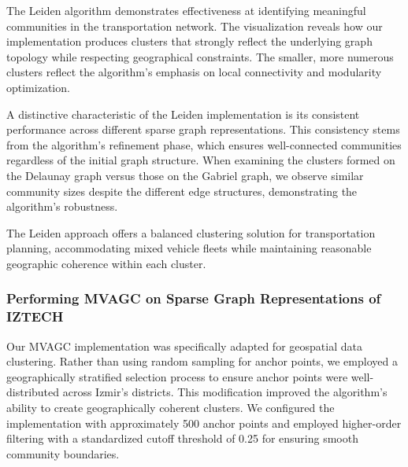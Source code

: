 The Leiden algorithm demonstrates effectiveness at identifying meaningful communities in the transportation network. The visualization reveals how our implementation produces clusters that strongly reflect the underlying graph topology while respecting geographical constraints. The smaller, more numerous clusters reflect the algorithm's emphasis on local connectivity and modularity optimization.

A distinctive characteristic of the Leiden implementation is its consistent performance across different sparse graph representations. This consistency stems from the algorithm's refinement phase, which ensures well-connected communities regardless of the initial graph structure. When examining the clusters formed on the Delaunay graph versus those on the Gabriel graph, we observe similar community sizes despite the different edge structures, demonstrating the algorithm's robustness.

The Leiden approach offers a balanced clustering solution for transportation planning, accommodating mixed vehicle fleets while maintaining reasonable geographic coherence within each cluster.

\subsubsection{Performing MVAGC on Sparse Graph Representations of IZTECH}
\label{subsubsec:mvagc_implementation}

Our MVAGC implementation was specifically adapted for geospatial data clustering. Rather than using random sampling for anchor points, we employed a geographically stratified selection process to ensure anchor points were well-distributed across Izmir's districts. This modification improved the algorithm's ability to create geographically coherent clusters. We configured the implementation with approximately 500 anchor points and employed higher-order filtering with a standardized cutoff threshold of 0.25 for ensuring smooth community boundaries.

